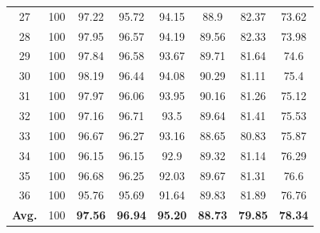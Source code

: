 \documentclass[review]{elsarticle}
\begin{document}
\begin{longtable}{c|ccccccc}
		27&100&97.22&95.72&94.15&88.9&82.37&73.62\\
		28&100&97.95&96.57&94.19&89.56&82.33&73.98\\
		29&100&97.84&96.58&93.67&89.71&81.64&74.6\\
		30&100&98.19&96.44&94.08&90.29&81.11&75.4\\
		31&100&97.97&96.06&93.95&90.16&81.26&75.12\\
		32&100&97.16&96.71&93.5&89.64&81.41&75.53\\
		33&100&96.67&96.27&93.16&88.65&80.83&75.87\\
		34&100&96.15&96.15&92.9&89.32&81.14&76.29\\
		35&100&96.68&96.25&92.03&89.67&81.31&76.6\\
		36&100&95.76&95.69&91.64&89.83&81.89&76.76\\
		\hline
		\textbf{Avg.}&100&\textbf{97.56}&\textbf{96.94}&\textbf{95.20}&\textbf{88.73}&\textbf{79.85}&\textbf{78.34}\\
		\hline\hline	
\end{longtable}
\end{document}
